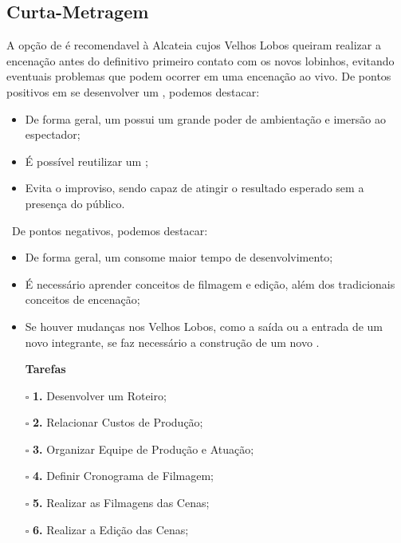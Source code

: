 		\subsection[Curta-Metragem]{Curta-Metragem}
		\label{subsec:sugestoes_encenacao_curtaMetragem}
			A opção de  é recomendavel à Alcateia cujos Velhos Lobos queiram realizar a encenação antes do definitivo primeiro contato com os novos lobinhos, evitando eventuais problemas que podem ocorrer em uma encenação ao vivo. De pontos positivos em se desenvolver um , podemos destacar:
			\begin{itemize}
				\item{De forma geral, um  possui um grande poder de ambientação e imersão ao espectador;}
				\item{É possível reutilizar um ;}
				\item{Evita o improviso, sendo capaz de atingir o resultado esperado sem a presença do público.}
			\end{itemize}
			\ \indent De pontos negativos, podemos destacar:
			\begin{itemize}
				\item{De forma geral, um  consome maior tempo de desenvolvimento;}
				\item{É necessário aprender conceitos de filmagem e edição, além dos tradicionais conceitos de encenação;}
				\item{Se houver mudanças nos Velhos Lobos, como a saída ou a entrada de um novo integrante, se faz necessário a construção de um novo .}
			\end{itemize}
			\begin{itemize}
				\item[]{\large{\textbf{Tarefas}}}
				\item[\LARGE{$\square$}]{\textbf{1.} Desenvolver um Roteiro;}
				\item[\LARGE{$\square$}]{\textbf{2.} Relacionar Custos de Produção;}
				\item[\LARGE{$\square$}]{\textbf{3.} Organizar Equipe de Produção e Atuação;}
				\item[\LARGE{$\square$}]{\textbf{4.} Definir Cronograma de Filmagem;}
				\item[\LARGE{$\square$}]{\textbf{5.} Realizar as Filmagens das Cenas;}
				\item[\LARGE{$\square$}]{\textbf{6.} Realizar a Edição das Cenas;}
			\end{itemize}
